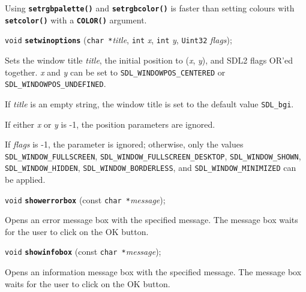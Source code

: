 \documentclass[a4paper,12pt]{article}
\newcommand{\V}{\texttt{void}}      %
\newcommand{\I}{\texttt{int}}       %
\newcommand{\Ut}{\texttt{Uint32}}   %
\newcommand{\C}{\texttt{char *}}    %
\newcommand{\func}[1]{\textbf{\texttt{#1}}}  %
\newcommand{\A}[1]{\emph{#1}}       %
\newcommand{\T}[1]{\texttt{#1}}     %
\newenvironment{bgi}
{ %
  \begin{snugshade}
}
{ %
  \end{snugshade}
}
\begin{document}
Using \func{setrgbpalette()} and \func{setrgbcolor()} is faster than
setting colours with \func{setco\-lor()} with a \func{COLOR()}
argument.


\label{sec:setwinoptions}

\begin{bgi}
\V{} \func{setwinoptions} (\C{}\A{title}, \I{} \A{x}, \I{} \A{y},
  \Ut{} \A{flags});
\end{bgi}

Sets the window title \A{title}, the initial position to (\A{x},
\A{y}), and SDL2 flags OR'ed together. \A{x} and \A{y} can be set to
\T{SDL\_WINDOWPOS\_CENTERED} or \T{SDL\_WINDOWPOS\_UNDEFINED}.

If \A{title} is an empty string, the window title is set to the
default value \T{SDL\_bgi}.

If either \A{x} or \A{y} is -1, the position parameters are ignored.

If \A{flags} is -1, the parameter is ignored; otherwise, only the
values \T{SDL\_WINDOW\_FULLSCREEN},
\T{SDL\_WIN\-DOW\_FULLSCREEN\_DESKTOP}, \T{SDL\_WINDOW\_SHOWN},
\T{SDL\_WINDOW\_HIDDEN}, \T{SDL\_WINDOW\-\_BORDERLESS}, and
\T{SDL\_WINDOW\_MINIMIZED} can be applied.


\label{sec:showerrorbox}

\begin{bgi}
\V{} \func{showerrorbox} (const \C{}\A{message});
\end{bgi}

Opens an error message box with the specified message. The message box
waits for the user to click on the OK button.


\label{sec:showinfobox}

\begin{bgi}
\V{} \func{showinfobox} (const \C{}\A{message});
\end{bgi}

Opens an information message box with the specified message. The
message box waits for the user to click on the OK button.


\label{sec:swapbuffers}
\end{document}
